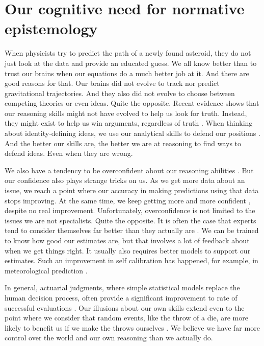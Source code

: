 \documentclass{article}
\begin{document}
	
	\section{Our cognitive need for normative epistemology}
	
	When physicists try to predict the path of a newly found asteroid, they do not just look at the data and provide an educated guess. We all know better than to trust our brains when our equations do a much better job at it. And there are good reasons for that. Our brains did not evolve to track nor predict gravitational trajectories. And they also did not evolve to choose between competing theories or even ideas. Quite the opposite. Recent evidence shows that our reasoning skills might not have evolved to help us look for truth. Instead, they might exist to help us win arguments, regardless of truth \cite{merciersperber11a}. When thinking about identity-defining ideas, we use our analytical skills to defend our positions  \cite{kahan13a}.  And the better our skills are, the better we are at reasoning to find ways to defend ideas. Even when they are wrong. 
	
	We also have a tendency to be overconfident about our reasoning abilities \cite{oskamp65a}. But our confidence also plays strange tricks on us. As we get more data about an issue, we reach a point where our accuracy  in making predictions using that data stops improving.  At the same time, we keep getting more and more confident \cite{tsaietal08a}, despite no real improvement. Unfortunately, overconfidence is not limited to the issues we are not specialists. Quite the opposite. It is often the case that experts tend to consider themselves far better than they actually are \cite{christensenszalanskbusyhead81a}. We can be trained to know how good our estimates are, but that involves a lot of feedback about when we get things right. It usually also requires better models to support our estimates. Such an improvement in self calibration has happened, for example, in meteorological prediction \cite{murphywinkler84a}.
	
	
	In general,  actuarial judgments, where simple statistical models replace the human decision process, often provide a significant improvement to rate of successful evaluations \cite{dawesetal89a}. Our illusions about our own skills extend even to the point where we consider that random events, like the throw of a die, are more likely to benefit us if we make the throws ourselves \cite{proninetal06a}. We believe we have far more control over the world and our own reasoning than we actually do.
	
\end{document}
